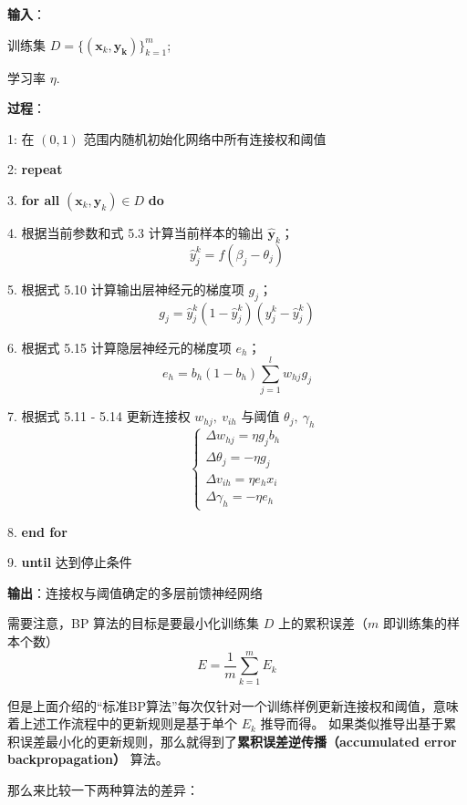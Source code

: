 \documentclass[../studies-ml.tex]{subfiles}
\begin{document}
\begin{shaded}
  \textbf{输入}：

  训练集 $D = \{(\pmb{x}_k, \pmb{y_k})\}_{k=1}^m$;

  学习率 $\eta$.
  \bigskip

  \textbf{过程}：

  1: 在 $(0,1)$ 范围内随机初始化网络中所有连接权和阈值

  2: \textbf{repeat}

  3. \aidnt \textbf{for all} $(\pmb{x}_k, \pmb{y}_k) \in D$ \textbf{do}

  4. \aidnt[2] 根据当前参数和式 5.3 计算当前样本的输出 $\hat{\pmb{y}}_k$；
  \[ \hat{y}_j^k = f(\beta_j - \theta_j) \]

  5. \aidnt[2] 根据式 5.10 计算输出层神经元的梯度项 $g_j$；
  \[ g_j = \hat{y}_j^k (1 - \hat{y}_j^k) (y_j^k - \hat{y}_j^k) \]

  6. \aidnt[2] 根据式 5.15 计算隐层神经元的梯度项 $e_h$；
  \[ e_h = b_h (1 - b_h) \sum_{j=1}^{l} w_{hj} g_j \]

  7. \aidnt[2] 根据式 5.11 - 5.14 更新连接权 $w_{hj},\ v_{ih}$ 与阈值 $\theta_j,\ \gamma_h$
  \begin{equation*}
    \begin{cases}
      \Delta w_{hj} = \eta g_j b_h \\
      \Delta \theta_j = -\eta g_j  \\
      \Delta v_{ih} = \eta e_h x_i \\
      \Delta \gamma_h = -\eta e_h
    \end{cases}
  \end{equation*}

  8. \aidnt \textbf{end for}

  9. \textbf{until} 达到停止条件

  \textbf{输出}：连接权与阈值确定的多层前馈神经网络
\end{shaded}

需要注意，BP 算法的目标是要最小化训练集 $D$ 上的累积误差（$m$ 即训练集的样本个数）
\begin{equation}
  E = \frac{1}{m} \sum_{k=1}^{m} E_k
\end{equation}

但是上面介绍的“标准BP算法”每次仅针对一个训练样例更新连接权和阈值，意味着上述工作流程中的更新规则是基于单个 $E_k$ 推导而得。
如果类似推导出基于累积误差最小化的更新规则，那么就得到了\textbf{累积误差逆传播（accumulated error backpropagation）}
算法。

\bigbreak
那么来比较一下两种算法的差异：
\end{document}
